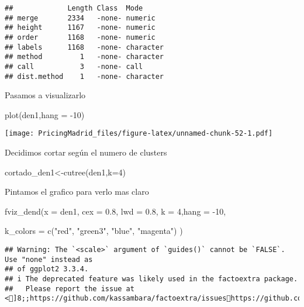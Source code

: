 \documentclass[
]{article}
\newenvironment{Shaded}{\begin{snugshade}}{\end{snugshade}}
\newcommand{\AttributeTok}[1]{\textcolor[rgb]{0.77,0.63,0.00}{#1}}
\newcommand{\DecValTok}[1]{\textcolor[rgb]{0.00,0.00,0.81}{#1}}
\newcommand{\FloatTok}[1]{\textcolor[rgb]{0.00,0.00,0.81}{#1}}
\newcommand{\FunctionTok}[1]{\textcolor[rgb]{0.00,0.00,0.00}{#1}}
\newcommand{\NormalTok}[1]{#1}
\newcommand{\OtherTok}[1]{\textcolor[rgb]{0.56,0.35,0.01}{#1}}
\newcommand{\SpecialCharTok}[1]{\textcolor[rgb]{0.00,0.00,0.00}{#1}}
\newcommand{\StringTok}[1]{\textcolor[rgb]{0.31,0.60,0.02}{#1}}
\begin{document}
\begin{verbatim}
##             Length Class  Mode     
## merge       2334   -none- numeric  
## height      1167   -none- numeric  
## order       1168   -none- numeric  
## labels      1168   -none- character
## method         1   -none- character
## call           3   -none- call     
## dist.method    1   -none- character
\end{verbatim}

Pasamos a visualizarlo

\begin{Shaded}
\begin{Highlighting}[]
\FunctionTok{plot}\NormalTok{(den1,}\AttributeTok{hang =} \SpecialCharTok{{-}}\DecValTok{10}\NormalTok{)}
\end{Highlighting}
\end{Shaded}

\texttt{[image: PricingMadrid\_files/figure-latex/unnamed-chunk-52-1.pdf]}

Decidimos cortar según el numero de clusters

\begin{Shaded}
\begin{Highlighting}[]
\NormalTok{cortado\_den1}\OtherTok{\textless{}{-}}\FunctionTok{cutree}\NormalTok{(den1,}\AttributeTok{k=}\DecValTok{4}\NormalTok{)}
\end{Highlighting}
\end{Shaded}

Pintamos el grafico para verlo mas claro

\begin{Shaded}
\begin{Highlighting}[]
\FunctionTok{fviz\_dend}\NormalTok{(}\AttributeTok{x =}\NormalTok{ den1, }\AttributeTok{cex =} \FloatTok{0.8}\NormalTok{, }\AttributeTok{lwd =} \FloatTok{0.8}\NormalTok{, }\AttributeTok{k =} \DecValTok{4}\NormalTok{,}\AttributeTok{hang =} \SpecialCharTok{{-}}\DecValTok{10}\NormalTok{,}

          \AttributeTok{k\_colors =} \FunctionTok{c}\NormalTok{(}\StringTok{"red"}\NormalTok{, }\StringTok{"green3"}\NormalTok{, }\StringTok{"blue"}\NormalTok{, }\StringTok{"magenta"}\NormalTok{) )}
\end{Highlighting}
\end{Shaded}

\begin{verbatim}
## Warning: The `<scale>` argument of `guides()` cannot be `FALSE`. Use "none" instead as
## of ggplot2 3.3.4.
## i The deprecated feature was likely used in the factoextra package.
##   Please report the issue at <]8;;https://github.com/kassambara/factoextra/issueshttps://github.com/kassambara/factoextra/issues]8;;>.
\end{verbatim}
\end{document}
